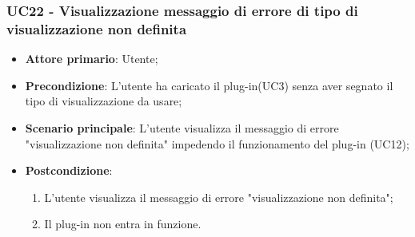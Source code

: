 \subsubsection{UC22 - Visualizzazione messaggio di errore di tipo di visualizzazione non definita}
\label{sssec:uc22}
\begin{itemize}
  \item \textbf{Attore primario}: Utente;
  \item \textbf{Precondizione}: L'utente ha caricato il plug-in(UC3) senza aver segnato il tipo di visualizzazione da usare;
  \item \textbf{Scenario principale}: L'utente visualizza il messaggio di errore "visualizzazione non definita" impedendo il funzionamento del plug-in (UC12);
  \item \textbf{Postcondizione}:
  \begin{enumerate}
		\item L'utente visualizza il messaggio di errore "visualizzazione non definita";
		\item Il plug-in non entra in funzione.
	\end{enumerate}
\end{itemize}
